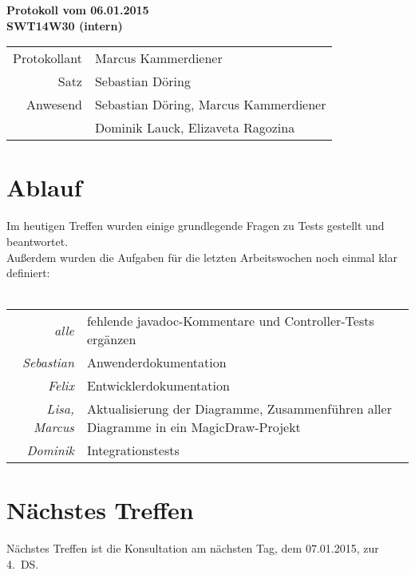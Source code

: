 \documentclass{scrartcl}
\begin{document}
\begin{center}
\LARGE \bf{Protokoll vom 06.01.2015 \\
SWT14W30 (intern)}
\end{center}

\begin{tabular}{rp{10cm}}
Protokollant & Marcus Kammerdiener \\
Satz & Sebastian Döring \\
Anwesend & Sebastian Döring, Marcus Kammerdiener \\
         & Dominik Lauck, Elizaveta Ragozina \\
\end{tabular}

\vspace*{3em}

\section{Ablauf}
Im heutigen Treffen wurden einige grundlegende Fragen zu Tests gestellt und beantwortet.\\
Außerdem wurden die Aufgaben für die letzten Arbeitswochen noch einmal klar definiert:\\\\
\begin{tabularx}{\textwidth}{rX}
\textit{alle} & fehlende javadoc-Kommentare und Controller-Tests ergänzen \\[.3cm]
\textit{Sebastian} & Anwenderdokumentation \\[.3cm]
\textit{Felix} & Entwicklerdokumentation \\[.3cm]
\textit{Lisa, Marcus} & Aktualisierung der Diagramme, Zusammenführen aller Diagramme in ein MagicDraw-Projekt \\[.3cm]
\textit{Dominik} & Integrationstests \\
\end{tabularx}

\vspace*{1em}

\section{N\"achstes Treffen}
Nächstes Treffen ist die Konsultation am nächsten Tag, dem 07.01.2015, zur 4.~DS.
\end{document}
